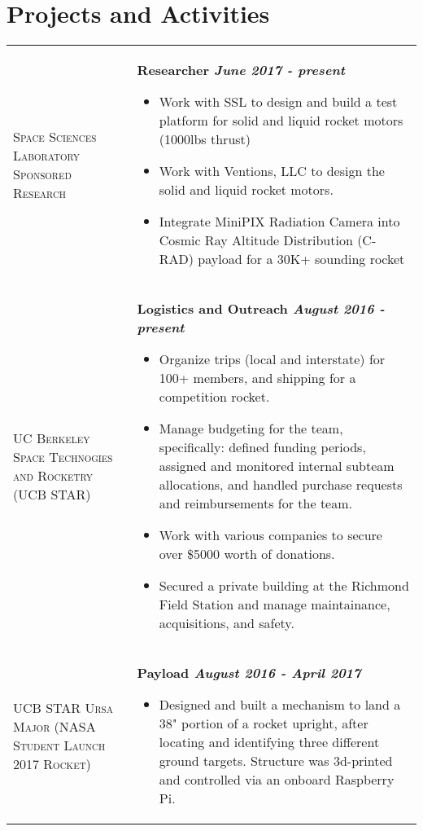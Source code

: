 \documentclass[letterpaper, 10pt]{article}
\begin{document}
\section{Projects and Activities}
\begin{flushleft}
  \begin{tabular}{>{\raggedright}p{1.3in} @{\hskip .2in} l}
      \textsc{Space Sciences Laboratory Sponsored Research}   & \parbox[t]{5.75in}{ \textbf{Researcher \hfill\textit{June 2017 - present}}
      \begin{itemize}
      \item Work with SSL to design and build a test platform for solid and liquid rocket motors (1000lbs thrust)
      \item Work with Ventions, LLC to design the solid and liquid rocket motors.
      \item Integrate MiniPIX Radiation Camera into Cosmic Ray Altitude Distribution (C-RAD) payload for a 30K+ sounding rocket
      \end{itemize}} \medskip \\

      \textsc{UC Berkeley Space Technogies and Rocketry (UCB STAR)}   & \parbox[t]{5.75in}{ \textbf{Logistics and Outreach \hfill\textit{August 2016 - present}}
      \begin{itemize}
      \item Organize trips (local and interstate) for 100+ members, and shipping for a competition rocket.
      \item Manage budgeting for the team, specifically: defined funding periods, assigned and monitored internal subteam allocations, and handled purchase requests and reimbursements for the team.
      \item Work with various companies to secure over \$5000 worth of donations.
      \item Secured a private building at the Richmond Field Station and manage maintainance, acquisitions, and safety.
      \end{itemize}} \medskip \\

      \textsc{UCB STAR Ursa Major (NASA Student Launch 2017 Rocket)}   & \parbox[t]{5.75in}{\textbf{Payload \hfill\textit{August 2016 - April 2017}}
      \begin{itemize}
      \item Designed and built a mechanism to land a 38" portion of a rocket upright, after locating and identifying three different ground targets. Structure was 3d-printed and controlled via an onboard Raspberry Pi.
      \end{itemize}} \smallskip \\


\end{tabular}
\end{flushleft}
\end{document}
